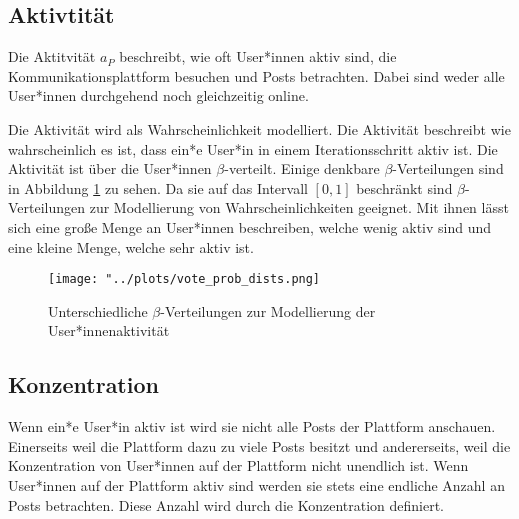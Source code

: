 \subsection{Aktivtität}


Die Aktitvität  $a_P$ beschreibt, wie oft User*innen aktiv sind, die Kommunikationsplattform besuchen und Posts betrachten. Dabei sind weder alle User*innen durchgehend noch gleichzeitig online.  

Die Aktivität wird als Wahrscheinlichkeit modelliert. Die Aktivität beschreibt wie wahrscheinlich es ist, dass ein*e User*in in einem Iterationsschritt aktiv ist. Die Aktivität ist über die User*innen $\beta$-verteilt. Einige denkbare $\beta$-Verteilungen sind in Abbildung \ref{fig:betas} zu sehen. Da sie auf das Intervall $[0,1]$ beschränkt sind $\beta$-Verteilungen zur Modellierung von Wahrscheinlichkeiten geeignet. Mit ihnen lässt sich eine große Menge an User*innen beschreiben, welche wenig aktiv sind und eine kleine Menge, welche sehr aktiv ist.

\begin{figure}[!h]
	\texttt{[image: "../plots/vote\_prob\_dists.png]}
	\label{fig:betas}
	\caption{Unterschiedliche $\beta$-Verteilungen zur Modellierung der User*innenaktivität}
\end{figure}


\subsection{Konzentration}

Wenn ein*e User*in aktiv ist wird sie nicht alle Posts der Plattform anschauen. Einerseits weil die Plattform dazu zu viele Posts besitzt und andererseits, weil die Konzentration von User*innen auf der Plattform nicht unendlich ist. Wenn User*innen auf der Plattform aktiv sind werden sie stets eine endliche Anzahl an Posts betrachten. Diese Anzahl wird durch die Konzentration definiert.

